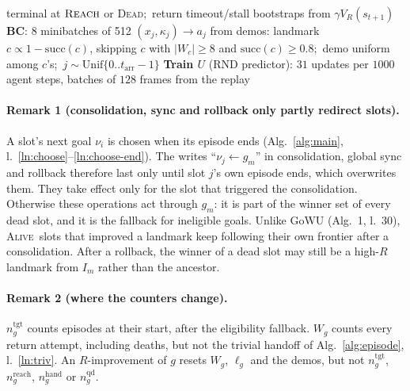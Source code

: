 \documentclass[10pt]{article}
\newcommand{\Reach}{\textsc{Reach}}
\newcommand{\Unif}{\mathrm{Unif}}
\newcommand{\succr}{\mathrm{succ}}
\newcommand{\Dead}{\textsc{Dead}}
\newcommand{\Alive}{\textsc{Alive}}
\begin{document}
\begin{algorithm}[H]
\begin{algorithmic}[1]
  \State \hspace{1em} terminal at $\Reach$ or \Dead;\ return timeout/stall bootstraps from $\gamma V_R(s_{t+1})$
  \State \textbf{BC}: 8 minibatches of 512 $(x_j, \kappa_j) \to a_j$ from demos: landmark $c \propto 1 - \succr(c)$,
  \State \hspace{1em} skipping $c$ with $|W_c| \ge 8$ and $\succr(c) \ge 0.8$;\ demo uniform among $c$'s;\ $j \sim \Unif\{0..t_{\text{arr}}{-}1\}$
  \State \textbf{Train $U$} (RND predictor): $31$ updates per $1000$ agent steps, batches of $128$ frames from the replay\label{ln:rnd}
\EndLoop
\end{algorithmic}
\end{algorithm}

\paragraph{Remark 1 (consolidation, sync and rollback only partly redirect slots).} A slot's next goal
$\nu_i$ is chosen when its episode ends (Alg.~\ref{alg:main}, l.~\ref{ln:choose}--\ref{ln:choose-end}). The writes ``$\nu_j \gets g_m$''
in consolidation, global sync and rollback therefore last only until slot $j$'s own episode ends, which
overwrites them. They take effect only for the slot that triggered the consolidation. Otherwise these
operations act through $g_m$: it is part of the winner set of every dead slot, and it is the fallback for
ineligible goals. Unlike GoWU (Alg.~1, l.~30), \Alive\ slots that improved a landmark keep following their
own frontier after a consolidation. After a rollback, the winner of a dead slot may still be a high-$R$
landmark from $I_m$ rather than the ancestor.

\paragraph{Remark 2 (where the counters change).} $n^{\text{tgt}}_g$ counts episodes at their start, after
the eligibility fallback. $W_g$ counts every return attempt, including deaths, but not the trivial handoff
of Alg.~\ref{alg:episode}, l.~\ref{ln:triv}. An $R$-improvement of $g$ resets $W_g$, $\ell_g$ and the demos,
but not $n^{\text{tgt}}_g$, $n^{\text{reach}}_g$, $n^{\text{hand}}_g$ or $n^{\text{qd}}_g$.
\end{document}
